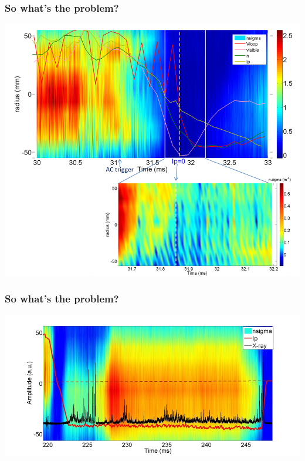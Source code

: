 \documentclass{beamer}
\begin{document}
\begin{frame}
\frametitle{So what's the problem?}

\centering
\includegraphics[scale=0.7]{imgs/residual-plasma.png}

\end{frame}

\begin{frame}
\frametitle{So what's the problem?}

\centering
\includegraphics[scale=0.78]{imgs/re-presence.png}

\end{frame}













\end{document}
